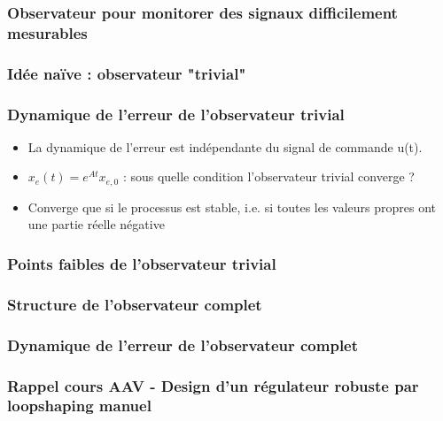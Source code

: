 \documentclass[document.tex]{subfiles}
\begin{document}
\subsubsection{Observateur pour monitorer des signaux difficilement mesurables}

\subsubsection{Idée naïve : observateur "trivial"}

\subsubsection{Dynamique de l'erreur de l'observateur trivial}

\begin{itemize}
\item La dynamique de l'erreur est indépendante du signal de commande u(t).
\item $x_e(t)=e^{At}x_{e,0}$ : sous quelle condition l'observateur trivial converge ?
\item Converge que si le processus est stable, i.e. si toutes les valeurs propres ont une partie réelle négative
\end{itemize}

\subsubsection{Points faibles de l'observateur trivial}

\subsubsection{Structure de l'observateur complet}


\subsubsection{Dynamique de l'erreur de l'observateur complet}












\subsubsection{Rappel cours AAV - Design d'un régulateur robuste par loopshaping manuel}

\end{document}
